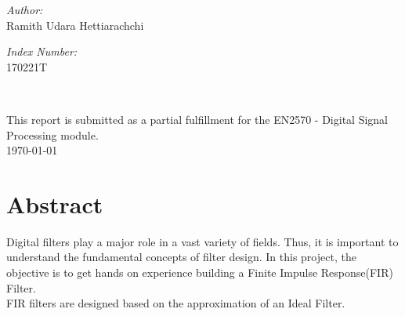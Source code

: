 \documentclass[11pt]{article}
\begin{document}
\begin{center}
\begin{minipage}{0.46\textwidth}
\begin{flushleft}
\emph{Author:}\\	
Ramith Udara Hettiarachchi\\

\end{flushleft}																		%
\end{minipage}		
\begin{minipage}{0.52\textwidth}		
\vspace{-0.6cm}											%
\begin{flushright} \large															%
\emph{Index Number:} \\																	%
170221T\\														%
\end{flushright}																	%
\end{minipage}	
\vspace*{1cm}
 	
 		\flushleft{\textbf{\Large }}\\																		%
\vspace{2cm} 
\end{center}

\begin{center}	
This report is submitted as a partial fulfillment for the EN2570 - Digital Signal Processing module.\\
{\large \today}																	%
\end{center}										  						


\tableofcontents 
\listoffigures
\listoftables
\pagebreak
\newpage
\section{Abstract}

Digital filters play a major role in a vast variety of fields. Thus, it is important to understand the fundamental concepts of filter design. 
In this project, the objective is to get hands on experience building a Finite Impulse Response(FIR) Filter. \\ 
FIR filters are designed based on the approximation of an Ideal Filter.
\end{document}
